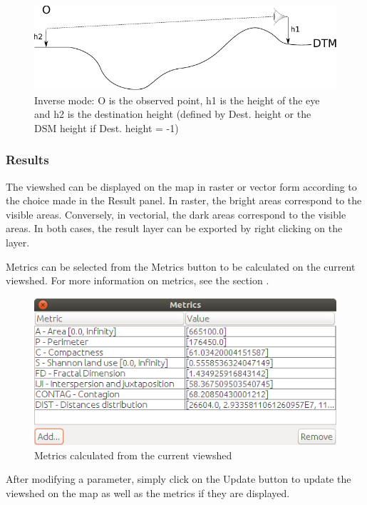 \documentclass{report}
\begin{document}
\begin{figure}[H]
	\includegraphics{img/height_view_inverse-en.pdf} 
	\caption{Inverse mode: O is the observed point, h1 is the height of the eye and h2 is the destination height (defined by  Dest. height or the DSM height if Dest. height = -1)}
	\label{height_view_inverse}	
\end{figure}

\subsubsection{Results}

The viewshed can be displayed on the map in raster or vector form according to the choice made in the Result panel. In raster, the bright areas correspond to the visible areas. Conversely, in vectorial, the dark areas correspond to the visible areas. In both cases, the result layer can be exported by right clicking on the layer.

Metrics can be selected from the Metrics button to be calculated on the current viewshed. For more information on metrics, see the section .

\begin{figure}[H]
	\includegraphics[scale=0.5]{img/viewshed_metric-en.png} 
	\caption{Metrics calculated from the current viewshed}
	\label{viewshed_metric}
\end{figure}

After modifying a parameter, simply click on the Update button to update the viewshed on the map as well as the metrics if they are displayed.
\end{document}
